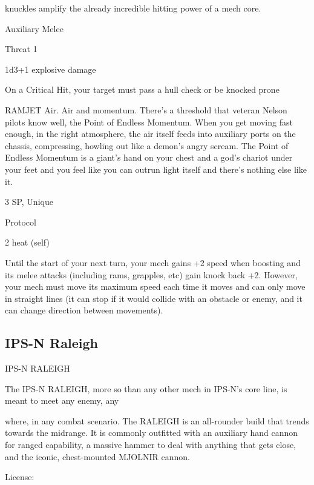knuckles amplify the already incredible hitting power of a mech core.   

Auxiliary Melee
 
Threat 1
 
1d3+1 explosive damage
 
On a Critical Hit, your target must pass a hull check or be knocked prone
 

RAMJET  
Air. Air and momentum. There’s a threshold that veteran Nelson pilots know well, the Point of Endless  
Momentum. When you get moving fast enough, in the right atmosphere, the air itself feeds into auxiliary  
ports on the chassis, compressing, howling out like a demon’s angry scream. The Point of Endless  
Momentum is a giant’s hand on your chest and a god’s chariot under your feet and you feel like you can  
outrun light itself and there’s nothing else like it.  

3 SP, Unique
 
Protocol
 
2 heat (self)
 
Until the start of your next turn, your mech gains +2 speed when boosting and its melee attacks  
(including rams, grapples, etc) gain knock back +2. However, your mech must move its  
maximum speed each time it moves and can only move in straight lines (it can stop if it would  
collide with an obstacle or enemy, and it can change direction between movements).
 

                                                                                                                    

\subsection{IPS-N Raleigh}
                                                             
                                              IPS-N RALEIGH  

The IPS-N RALEIGH, more so than any other mech in IPS-N’s core line, is meant to meet any enemy, any  

where, in any combat scenario. The RALEIGH is an all-rounder build that trends towards the midrange. It is  
commonly outfitted with an auxiliary hand cannon for ranged capability, a massive hammer to deal with  
anything that gets close, and the iconic, chest-mounted MJOLNIR cannon.  

                                                      License:
 
